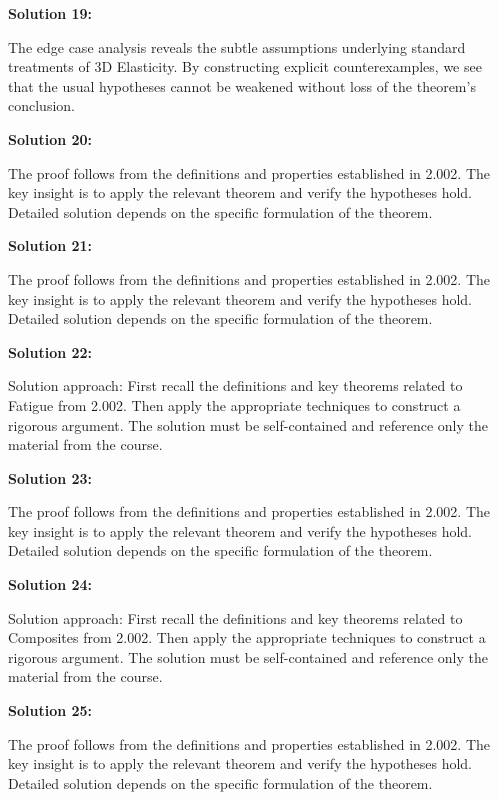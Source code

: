 \documentclass[12pt,a4paper]{exam}
\begin{document}
\vspace{0.5cm}

\textbf{Solution 19:}

The edge case analysis reveals the subtle assumptions underlying standard treatments of 3D Elasticity. By constructing explicit counterexamples, we see that the usual hypotheses cannot be weakened without loss of the theorem's conclusion.

\vspace{0.5cm}

\textbf{Solution 20:}

The proof follows from the definitions and properties established in 2.002. The key insight is to apply the relevant theorem and verify the hypotheses hold. Detailed solution depends on the specific formulation of the theorem.

\vspace{0.5cm}

\textbf{Solution 21:}

The proof follows from the definitions and properties established in 2.002. The key insight is to apply the relevant theorem and verify the hypotheses hold. Detailed solution depends on the specific formulation of the theorem.

\vspace{0.5cm}

\textbf{Solution 22:}

Solution approach: First recall the definitions and key theorems related to Fatigue from 2.002. Then apply the appropriate techniques to construct a rigorous argument. The solution must be self-contained and reference only the material from the course.

\vspace{0.5cm}

\textbf{Solution 23:}

The proof follows from the definitions and properties established in 2.002. The key insight is to apply the relevant theorem and verify the hypotheses hold. Detailed solution depends on the specific formulation of the theorem.

\vspace{0.5cm}

\textbf{Solution 24:}

Solution approach: First recall the definitions and key theorems related to Composites from 2.002. Then apply the appropriate techniques to construct a rigorous argument. The solution must be self-contained and reference only the material from the course.

\vspace{0.5cm}

\textbf{Solution 25:}

The proof follows from the definitions and properties established in 2.002. The key insight is to apply the relevant theorem and verify the hypotheses hold. Detailed solution depends on the specific formulation of the theorem.

\vspace{0.5cm}
\end{document}
